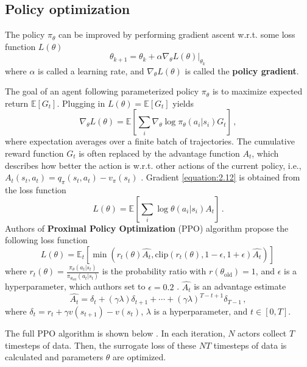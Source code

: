 \subsection{Policy optimization} \label{policy_optimization}

The policy $\pi_\theta$ can be improved by performing gradient ascent w.r.t. some loss function $L(\theta)$ \cite{openai_policy_optimization}
\begin{equation}
	\theta_{k+1} = \theta_k + \alpha \nabla_\theta L(\theta)|_{\theta_k} \,
\end{equation}
where $\alpha$ is called a learning rate, and $\nabla_\theta L(\theta)$ is called the \textbf{policy gradient}. 
\par
The goal of an agent following parameterized policy $\pi_\theta$ is to maximize expected return $\mathbb{E} \left [ G_t \right ]$. Plugging in $L(\theta) = \mathbb{E} \left [ G_t \right ]$ yields \cite{openai_policy_optimization,DBLP:journals/corr/SchulmanWDRK17}
\begin{equation} \label{equation:2.12}
	\nabla_\theta L(\theta) = \mathbb{E} \left [ \sum_i \nabla_\theta \log \pi_\theta(a_i|s_i) G_t \right ] \, ,
\end{equation}
where expectation averages over a finite batch of trajectories. The cumulative reward function $G_t$ is often replaced by the advantage function $A_t$, which describes how better the action is w.r.t. other actions of the current policy, i.e., $A_t(s_t,a_t) = q_\pi(s_t, a_t) - v_\pi(s_t)$ \cite{openai_policy_optimization}. Gradient \ref{equation:2.12} is obtained from the loss function \cite{DBLP:journals/corr/SchulmanWDRK17}
\begin{equation}
	L(\theta) = \mathbb{E} \left [ \sum_i \log \theta(a_i|s_i) A_t \right ] \, .
\end{equation}
Authors of \textbf{Proximal Policy Optimization} (PPO) algorithm \cite{DBLP:journals/corr/SchulmanWDRK17} propose the following loss function
\begin{equation}
	L(\theta) = \mathbb{E}_t \left [ \min \left( r_t(\theta) \hat{A_t} , \text{clip}(r_t(\theta), 1-\epsilon, 1+\epsilon) \hat{A_t} \right) \right ] \,
\end{equation}
where $r_t(\theta) = \frac{\pi_\theta(a_t|s_t)}{\pi_{\theta_\text{old}}(a_t|s_t)}$ is the probability ratio with $r(\theta_\text{old}) = 1$, and $\epsilon$ is a hyperparameter, which authors set to $\epsilon = 0.2$ \cite{DBLP:journals/corr/SchulmanWDRK17}. $\hat{A_t}$ is an advantage estimate \cite{DBLP:journals/corr/SchulmanWDRK17}
\begin{equation}
	\hat{A_t} = \delta_t + (\gamma \lambda) \delta_{t+1} + \cdots + (\gamma\lambda)^{T - t + 1} \delta_{T - 1} \, ,
\end{equation}
where $\delta_t = r_t + \gamma v(s_{t+1}) - v(s_t)$, $\lambda$ is a hyperparameter, and $t \in \left [ 0, T \right ]$.
\par
The full PPO algorithm is shown below \cite{DBLP:journals/corr/SchulmanWDRK17}. In each iteration, $N$ actors collect $T$ timesteps of data. Then, the surrogate loss of these $NT$ timesteps of data is calculated and parameters $\theta$ are optimized.

